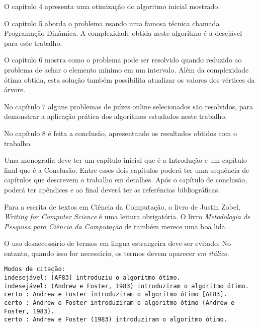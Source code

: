\vspace{0.2cm}

O capítulo 4 apresenta uma otimização do algoritmo inicial mostrado.

\vspace{0.2cm}

O capítulo 5 aborda o problema usando uma famosa técnica chamada Programação Dinâmica. A complexidade obtida neste algoritmo é a desejável para este trabalho.

\vspace{0.2cm}

O capítulo 6 mostra como o problema pode ser resolvido quando reduzido ao problema de achar o elemento mínimo em um intervalo. Além da complexidade ótima obtida, esta solução também possibilita atualizar os valores dos vértices da árvore.

\vspace{0.2cm}

No capítulo 7 alguns problemas de juízes online selecionados são resolvidos, para demonstrar a aplicação prática dos algoritmos estudados neste trabalho.

\vspace{0.2cm}

No capítulo 8 é feita a conclusão, apresentando os resultados obtidos com o trabalho.



\iffalse
Uma monografia deve ter um capítulo inicial que é a Introdução e um
capítulo final que é a Conclusão. Entre esses dois capítulos poderá
ter uma sequência de capítulos que descrevem o trabalho em detalhes.
Após o capítulo de conclusão, poderá ter apêndices e ao final deverá
ter as referências bibliográficas.


Para a escrita de textos em Ciência da Computação, o livro de Justin Zobel, 
\emph{Writing for Computer Science} \citep{zobel:04} é uma leitura obrigatória. 
O livro \emph{Metodologia de Pesquisa para Ciência da Computação} de 
\citet{waz:09} também merece uma boa lida.

O uso desnecessário de termos em lingua estrangeira deve ser evitado. No entanto,
quando isso for necessário, os termos devem aparecer \emph{em itálico}.

\begin{small}
\begin{verbatim}
Modos de citação:
indesejável: [AF83] introduziu o algoritmo ótimo.
indesejável: (Andrew e Foster, 1983) introduziram o algoritmo ótimo.
certo : Andrew e Foster introduziram o algoritmo ótimo [AF83].
certo : Andrew e Foster introduziram o algoritmo ótimo (Andrew e Foster, 1983).
certo : Andrew e Foster (1983) introduziram o algoritmo ótimo.
\end{verbatim}
\end{small}

